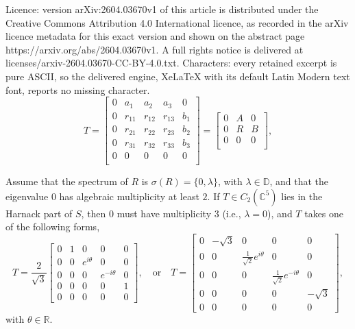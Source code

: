 \documentclass[10pt,a4paper]{amsart}
\begin{document}
Licence: version arXiv:2604.03670v1 of this article is distributed under the Creative Commons Attribution 4.0 International licence, as recorded in the arXiv licence metadata for this exact version and shown on the abstract page https://arxiv.org/abs/2604.03670v1. A full rights notice is delivered at licenses/arxiv-2604.03670-CC-BY-4.0.txt. Characters: every retained excerpt is pure ASCII, so the delivered engine, XeLaTeX with its default Latin Modern text font, reports no missing character.
\begin{equation}\label{form of T}
	T = \begin{bmatrix}
		0 & a_1 & a_2 & a_3 & 0 \\
		0 & r_{11} & r_{12} & r_{13} & b_1 \\
		0 & r_{21} & r_{22} & r_{23} & b_2 \\
		0 & r_{31} & r_{32} & r_{33} & b_3 \\
		0 & 0 & 0 & 0 & 0 \\
	\end{bmatrix} 
	= \begin{bmatrix}
		0 & A & 0 \\
		0 & R & B \\
		0 & 0 & 0 \\
	\end{bmatrix},
\end{equation} 

\begin{proposition}\label{Harnack_part_S_5} 
	Assume that the spectrum of $R$ is $\sigma(R)=\{ 0, \lambda \}$, with $\lambda \in \mathbb{D}$, and that the eigenvalue $0$ has algebraic multiplicity at least $2$. If $T\in C_2(\mathbb{C}^5)$ lies in the Harnack part of $S$, then $0$ must have multiplicity $3$ (i.e., $\lambda=0$), and $T$ takes one of the following forms,
	\begin{equation}\label{T case12}
		T=\frac{2}{\sqrt{3}} \begin{bmatrix}
			0 & 1 & 0 & 0 & 0 \\
			0 & 0 & e^{i\theta} & 0 & 0 \\
			0 & 0 & 0 & e^{-i\theta} & 0 \\
			0 & 0 & 0 & 0 & 1 \\
			0 & 0 & 0 & 0 & 0
		\end{bmatrix},\quad \text{or} \quad 
		T=  \begin{bmatrix}
			0 & -\sqrt{3} & 0 & 0 & 0 \\
			0 & 0 & \frac{1}{\sqrt{2}}e^{i\theta} & 0 & 0 \\
			0 & 0 & 0 & \frac{1}{\sqrt{2}}e^{-i\theta} & 0 \\
			0 & 0 & 0 & 0 & -\sqrt{3} \\
			0 & 0 & 0 & 0 & 0
		\end{bmatrix},
	\end{equation} 
	with $\theta \in \mathbb{R}$.	
\end{proposition}
\end{document}
